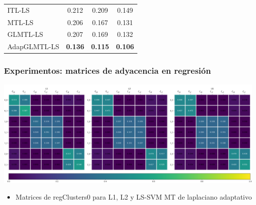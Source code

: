 \documentclass[aspectratio=43,spanish]{beamer}
\newcommand{\fmaxn}[1]{\textbf{#1}}
\newcommand{\fdata}[1]{\textsf{#1}}
\newcommand{\fmod}[1]{\textsf{#1}}
\begin{document}
\begin{frame}
\begin{table}
{\begin{tabular}{lccc}
                \fmod{ITL-LS}             &            0.212 &            0.209 &            0.149             \\
                \fmod{MTL-LS}       &            0.206 &            0.167 &            0.131         \\
                \fmod{GLMTL-LS}     &            0.207 &            0.169 &            0.132       \\
                \fmod{AdapGLMTL-LS} &            \fmaxn{0.136} &            \fmaxn{0.115} &            \fmaxn{0.106}  \\
                \bottomrule
            \end{tabular}
            }
        \end{table}

\end{frame}






\begin{frame}
      \frametitle{Experimentos: matrices de adyacencia en regresión}
      
      \centering
      \includegraphics[width=.95\textwidth]{Chapter6/IGPL2022/adjMatrix_all__regClusters_0_crop.pdf}

      \begin{itemize}
            \item Matrices de \fdata{regClusters0} para L1, L2 y LS-SVM MT de laplaciano adaptativo
      \end{itemize}
      

\end{frame}
\end{document}
